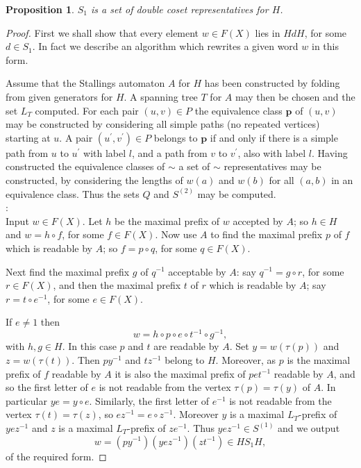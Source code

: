 \documentclass[a4paper,12pt]{article}
\renewcommand{\t}{\tau }
\newcommand{\pp}{\mathbf{p}}
\newtheorem{proposition}[theorem]{Proposition}
\numberwithin{equation}{section}
\numberwithin{figure}{section}
\begin{document}
\begin{proposition}\label{prop:dcreps}
$S_1$ is a set of double coset representatives for $H$.
\end{proposition}
\begin{proof}
First we shall show that every element $w\in F(X)$ lies in $HdH$,
for some $d\in S_1$. In fact we describe an algorithm which
rewrites a given word $w$ in this form.

Assume that the Stallings automaton $A$ for $H$ has been constructed by folding from
given generators for $H$. A spanning tree $T$
for $A$ may then be chosen and the
set $L_T$ computed. For each pair $(u,v)\in P$ the equivalence class $\pp$ of
$(u,v)$ may be constructed by considering all simple paths (no repeated vertices)
starting at $u$. A pair $(u^\prime ,v^\prime) \in P$ belongs to $\pp$
if and only
if there is a simple path from $u$ to $u^\prime$ with label $l$,
and a path from $v$ to $v^\prime$, also with label $l$.
Having constructed the equivalence classes of $\sim$
 a set of $\sim$ representatives may be constructed, by considering the
lengths of $w(a)$ and $w(b)$ for all $(a,b)$ in an equivalence class. Thus the
sets $Q$ and $S^{(2)}$ may be computed.   \\

:\\
Input $w\in F(X)$.
Let $h$ be the maximal prefix of $w$ accepted by $A$; so $h\in H$ and
$w=h\circ f$, for some $f\in F(X)$. Now use $A$ to find the maximal prefix $p$
of $f$ which is readable by $A$;
 so $f= p\circ q$, for some $q\in F(X)$.

Next find the maximal prefix $g$ of $q^{-1}$ acceptable by $A$: say
$q^{-1}=g\circ r$, for some $r\in F(X)$, and then the maximal prefix
$t$ of $r$ which
is readable by $A$; say $r=t\circ e^{-1}$, for some $e\in F(X)$.

If $e\neq 1$ then
\[w=h\circ p \circ e\circ t^{-1}\circ g^{-1},\]
with $h,g\in H$. In this case $p$ and $t$ are readable by $A$. Set $y=w(\t(p))$
and $z=w(\t(t))$. Then $py^{-1}$ and $tz^{-1}$ belong to $H$. Moreover, as $p$
is the maximal prefix of $f$ readable by $A$  it is also the maximal
prefix of $pet^{-1}$ readable by $A$,  and so
  the
first letter of $e$ is not readable from the vertex $\t(p)=\t(y)$ of $A$.
In particular
$ye=y\circ e$. Similarly, the first letter of $e^{-1}$ is not readable from
the vertex $\t(t)=\t(z)$, so $ez^{-1}=e\circ z^{-1}$. Moreover $y$ is a
maximal $L_T$-prefix of $yez^{-1}$ and $z$ is a maximal $L_T$-prefix of $ze^{-1}$.
Thus $yez^{-1}\in S^{(1)}$ and we output
\[w=(py^{-1}) (yez^{-1})(zt^{-1})\in HS_1H,\]
of the required form.


\end{proof}
\end{document}
